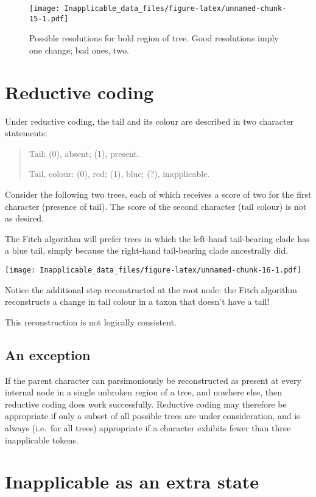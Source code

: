 \documentclass[]{book}
\theoremstyle{definition}
\theoremstyle{definition}
\theoremstyle{definition}
\theoremstyle{remark}
\begin{document}
\begin{figure}
\centering
\texttt{[image: Inapplicable\_data\_files/figure-latex/unnamed-chunk-15-1.pdf]}
\caption{\label{fig:unnamed-chunk-15}Possible resolutions for bold region of
tree. Good resolutions imply one change; bad ones, two.}
\end{figure}

\section{Reductive coding}\label{reductive-coding}

Under reductive coding, the tail and its colour are described in two
character statements:

\begin{quote}
Tail: (0), absent; (1), present.

Tail, colour: (0), red; (1), blue; (?), inapplicable.
\end{quote}

Consider the following two trees, each of which receives a score of two
for the first character (presence of tail). The score of the second
character (tail colour) is not as desired.

The Fitch algorithm will prefer trees in which the left-hand
tail-bearing clade has a blue tail, simply because the right-hand
tail-bearing clade ancestrally did.

\texttt{[image: Inapplicable\_data\_files/figure-latex/unnamed-chunk-16-1.pdf]}

Notice the additional step reconstructed at the root node: the Fitch
algorithm reconstructs a change in tail colour in a taxon that doesn't
have a tail!

This reconstruction is not logically consistent.

\subsection{An exception}\label{an-exception}

If the parent character can parsimoniously be reconstructed as present
at every internal node in a single unbroken region of a tree, and
nowhere else, then reductive coding does work successfully. Reductive
coding may therefore be appropriate if only a subset of all possible
trees are under consideration, and is always (i.e.~for all trees)
appropriate if a character exhibits fewer than three inapplicable
tokens.

\section{Inapplicable as an extra
state}\label{inapplicable-as-an-extra-state}
\end{document}
